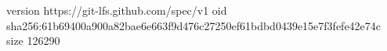 version https://git-lfs.github.com/spec/v1
oid sha256:61b69400a900a82bae6e663f9d476c27250ef61bdbd0439e15e7f3fefe42e74c
size 126290
